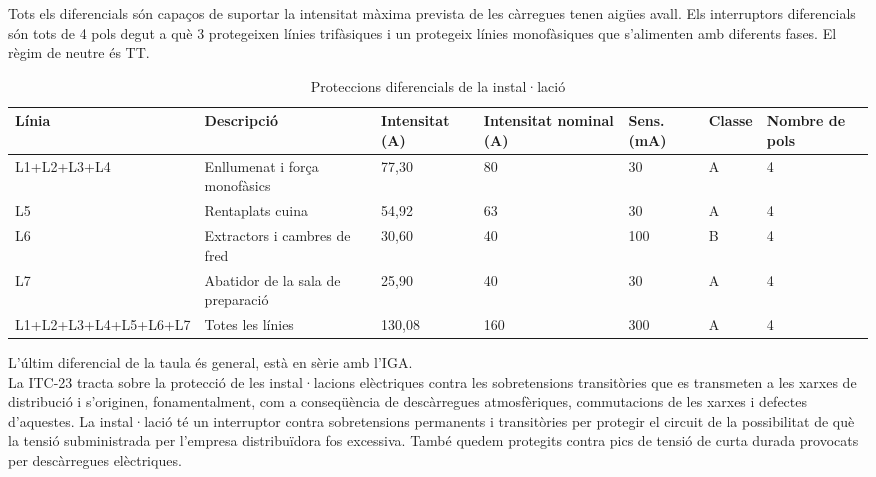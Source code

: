 \newline Tots els diferencials són capaços de suportar la intensitat màxima prevista de les càrregues tenen aigües avall. Els interruptors diferencials són tots de 4 pols degut a què 3 protegeixen línies trifàsiques i un protegeix línies monofàsiques que s'alimenten amb diferents fases. El règim de neutre és TT.
\begin{table}[H]
\small
\begin{center}
 \begin{tabu} to \textwidth {|X[3, l]|X[2, l]|X[r]|X[r]|X[1,r]|X[1,r]|X[r]|}%
 \hline
 Línia & Descripció & Intensitat (A) & Intensitat nominal (A) & Sens. (mA) & Classe & Nombre de pols \\
 \hline \hline 
L1+L2+L3+L4 & Enllumenat i força monofàsics & 77,30 & 80 & 30 & A & 4 \\ \hline
L5 & Rentaplats cuina & 54,92 & 63 & 30 & A & 4 \\ \hline
L6 & Extractors i cambres de fred & 30,60 & 40 & 100 & B & 4 \\ \hline
L7 & Abatidor de la sala de preparació & 25,90 & 40 & 30 & A & 4 \\ \hline \hline
L1+L2+L3+L4+L5+L6+L7 & Totes les línies & 130,08 & 160 & 300 & A & 4 \\ \hline
 \end{tabu}
 \caption{Proteccions diferencials de la instal·lació}
\end{center}
\end{table}
\noindent L'últim diferencial de la taula és general, està en sèrie amb l'IGA.\\
\newline
La ITC-23 tracta sobre la protecció de les instal·lacions elèctriques contra les sobretensions transitòries que es transmeten a les xarxes de distribució i s'originen, fonamentalment, com a conseqüència de descàrregues atmosfèriques, commutacions de les xarxes i defectes d'aquestes.
La instal·lació té un interruptor contra sobretensions permanents i transitòries per protegir el circuit de la possibilitat de què la tensió subministrada per l'empresa distribuïdora fos excessiva. També quedem protegits contra pics de tensió de curta durada provocats per descàrregues elèctriques.

\clearpage